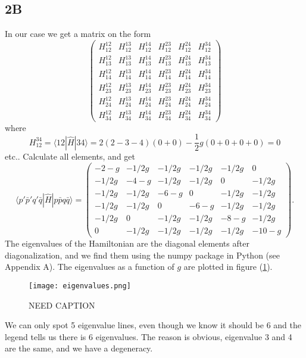 \documentclass[norsk,a4paper,12pt]{article}
\begin{document}
\subsection*{2B}
In our case we get a matrix on the form
\begin{equation}
\begin{pmatrix} 
H_{12}^{12}&H_{12}^{13}&H_{12}^{14}&H_{12}^{23}&H_{12}^{24}&H_{12}^{34}\\
H_{13}^{12}&H_{13}^{13}&H_{13}^{14}&H_{13}^{23}&H_{13}^{24}&H_{13}^{34}\\
H_{14}^{12}&H_{14}^{13}&H_{14}^{14}&H_{14}^{23}&H_{14}^{24}&H_{14}^{34}\\
H_{23}^{12}&H_{23}^{13}&H_{23}^{14}&H_{23}^{23}&H_{23}^{24}&H_{23}^{34}\\
H_{24}^{12}&H_{24}^{13}&H_{24}^{14}&H_{24}^{23}&H_{24}^{24}&H_{24}^{34}\\
H_{34}^{12}&H_{34}^{13}&H_{34}^{14}&H_{34}^{23}&H_{34}^{24}&H_{34}^{34} \end{pmatrix}
\end{equation}
where 
\begin{equation}
H_{12}^{34}=\langle 12|\hat{H}|34\rangle=2(2-3-4)(0+0)-\frac{1}{2}g(0+0+0+0)=0
\end{equation}
etc.. Calculate all elements, and get
\begin{equation}
\langle p'\bar{p}'q'\bar{q}|\hat{H}|p\bar{p}q\bar{q}\rangle=\begin{pmatrix} 
-2-g&-1/2g&-1/2g&-1/2g&-1/2g&0\\
-1/2g&-4-g&-1/2g&-1/2g&0&-1/2g\\
-1/2g&-1/2g&-6-g&0&-1/2g&-1/2g\\
-1/2g&-1/2g&0&-6-g&-1/2g&-1/2g\\
-1/2g&0&-1/2g&-1/2g&-8-g&-1/2g\\
0&-1/2g&-1/2g&-1/2g&-1/2g&-10-g \end{pmatrix}.
\end{equation}
The eigenvalues of the Hamiltonian are the diagonal elements after diagonalization, and we find them using the numpy package in Python (see Appendix A). The eigenvalues as a function of $g$ are plotted in figure (\ref{fig:eigenvalues}).
\begin{figure}[H]
\centering
\texttt{[image: eigenvalues.png]}
\caption{NEED CAPTION \label{fig:eigenvalues}}
\end{figure}
We can only spot 5 eigenvalue lines, even though we know it should be 6 and the legend tells us there is 6 eigenvalues. The reason is obvious, eigenvalue 3 and 4 are the same, and we have a degeneracy. 
\end{document}
